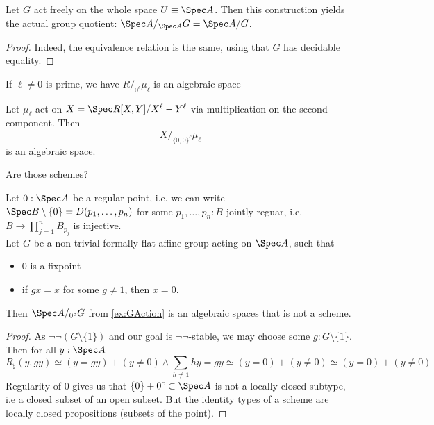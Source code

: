 \begin{example}
	Let $G$ act freely on the whole space $U \equiv \Spec A$. Then this construction yields the actual group quotient: $\Spec A  /_{\Spec A} G = \Spec A / G$.
\end{example}
\begin{proof}
	Indeed, the equivalence relation is the same, using that $G$ has decidable equality.
\end{proof}

\begin{example}
	If $\ell \neq 0$ is prime, we have $R /_{0^c} \mu_\ell$ is an algebraic space
\end{example}
\begin{example}
	Let $\mu_\ell$ act on $X = \Spec R[X,Y] / X^\ell - Y^\ell$ via multiplication on the second component. Then
	\[
	X /_{\{0,0\}^c} \mu_\ell
	\]
	is an algebraic space.
\end{example}
Are those schemes?

\begin{prop}	
	Let $0 : \Spec A$ be a regular point, i.e. we can write $\Spec B \setminus \{0\} = D(p_1,\hdots,p_n)$ for some $p_1,\hdots,p_n : B$ jointly-reguar, i.e. $B \to \prod_{j=1}^n B_{p_j}$ is injective. \\
	Let $G$ be a non-trivial formally \etale flat affine group acting on $\Spec A$, such that 
	\begin{itemize}
		\item 0 is a fixpoint
		\item if $g x = x$ for some $g \neq 1$, then $x = 0$. \\
	\end{itemize}
	Then $\Spec A /_{0^c} G$ from \ref{ex:GAction} is an algebraic spaces that is not a scheme.
\end{prop}
\begin{proof}
	As $\lnot \lnot (G \setminus \{1\})$ and our goal is $\lnot \lnot$-stable, we may choose some $g : G \setminus \{1\}$. Then for all $y : \Spec A$
	\[
	R_{\sharp}(y,gy) \simeq (y = gy) + (y \neq 0) \land \sum_{h \neq 1} h y = g y  {\simeq} (y = 0) + (y \neq 0) \simeq (y = 0) + (y \neq 0)
	\]	
	Regularity of $0$ gives us that $\{0\} + 0^c \subset \Spec A$ is not a locally closed subtype, i.e a closed subset of an open subset.
	But the identity types of a scheme are locally closed propositions (subsets of the point).
\end{proof}

